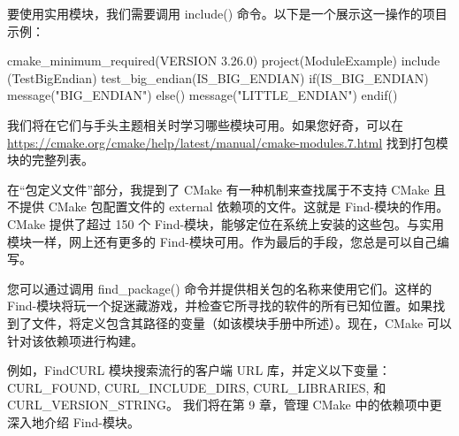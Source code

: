 要使用实用模块，我们需要调用 include() 命令。以下是一个展示这一操作的项目示例：


\begin{cmake}
cmake_minimum_required(VERSION 3.26.0)
project(ModuleExample)
include (TestBigEndian)
test_big_endian(IS_BIG_ENDIAN)
if(IS_BIG_ENDIAN)
message("BIG_ENDIAN")
else()
message("LITTLE_ENDIAN")
endif()
\end{cmake}

我们将在它们与手头主题相关时学习哪些模块可用。如果您好奇，可以在 \url{https://cmake.org/cmake/help/latest/manual/cmake-modules.7.html} 找到打包模块的完整列表。


在“包定义文件”部分，我提到了 CMake 有一种机制来查找属于不支持 CMake 且不提供 CMake 包配置文件的 external 依赖项的文件。这就是 Find-模块的作用。CMake 提供了超过 150 个 Find-模块，能够定位在系统上安装的这些包。与实用模块一样，网上还有更多的 Find-模块可用。作为最后的手段，您总是可以自己编写。

您可以通过调用 find\_package() 命令并提供相关包的名称来使用它们。这样的 Find-模块将玩一个捉迷藏游戏，并检查它所寻找的软件的所有已知位置。如果找到了文件，将定义包含其路径的变量（如该模块手册中所述）。现在，CMake 可以针对该依赖项进行构建。

例如，FindCURL 模块搜索流行的客户端 URL 库，并定义以下变量：CURL\_FOUND, CURL\_INCLUDE\_DIRS, CURL\_LIBRARIES, 和 CURL\_VERSION\_STRING。 我们将在第 9 章，管理 CMake 中的依赖项中更深入地介绍 Find-模块。







































